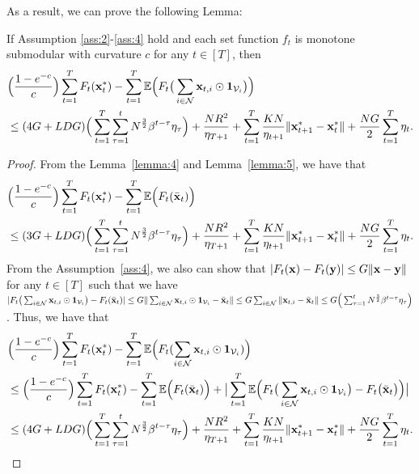 	As a result, we can prove the following Lemma:
	\begin{lemma}\label{thm:3}
	If Assumption \ref{ass:2}-\ref{ass:4} hold and each set function $f_{t}$ is monotone submodular with curvature $c$ for any $t\in[T]$, then
		\begin{equation*}
			\begin{aligned}
				&\Big(\frac{1-e^{-c}}{c}\Big)\sum_{t=1}^{T}F_{t}(\mathbf{x}^{*}_{t})-\sum_{t=1}^{T}\mathbb{E}\Big(F_{t}\big(\sum_{i\in\mathcal{N}}\mathbf{x}_{t,i}\odot\mathbf{1}_{\mathcal{V}_{i}}\big)\Big)\\
				&\le(4G+LDG)\Big(\sum_{t=1}^{T}\sum_{\tau=1}^{t}N^{\frac{3}{2}}\beta^{t-\tau}\eta_{\tau}\Big)+\frac{NR^{2}}{\eta_{T+1}}+\sum_{t=1}^{T}\frac{KN} {\eta_{t+1}}\|\mathbf{x}^{*}_{t+1}-\mathbf{x}^{*}_{t}\|+\frac{NG}{2}\sum_{t=1}^{T}\eta_{t}.		
			\end{aligned}
		\end{equation*}
	\end{lemma}
	\begin{proof}
		From the Lemma~\ref{lemma:4} and  Lemma~\ref{lemma:5}, we have that
		\begin{equation*}
			\begin{aligned}
				&\Big(\frac{1-e^{-c}}{c}\Big)\sum_{t=1}^{T}F_{t}(\mathbf{x}^{*}_{t})-\sum_{t=1}^{T}\mathbb{E}\Big(F_{t}(\bar{\mathbf{x}}_{t})\Big)\\
				&\le (3G+LDG)\Big(\sum_{t=1}^{T}\sum_{\tau=1}^{t}N^{\frac{3}{2}}\beta^{t-\tau}\eta_{\tau}\Big)+\frac{NR^{2}}{\eta_{T+1}}+\sum_{t=1}^{T}\frac{KN} {\eta_{t+1}}\|\mathbf{x}^{*}_{t+1}-\mathbf{x}^{*}_{t}\|+\frac{NG}{2}\sum_{t=1}^{T}\eta_{t}.	
			\end{aligned}
		\end{equation*}
		From the Assumption~\ref{ass:4}, we also can show that $|F_{t}(\mathbf{x})-F_{t}(\mathbf{y})|\le G\|\mathbf{x}-\mathbf{y}\|$ for any $t\in[T]$ such that we have $|F_{t}\big(\sum_{i\in\mathcal{N}}\mathbf{x}_{t,i}\odot\mathbf{1}_{\mathcal{V}_{i}}\big)-F_{t}(\bar{\mathbf{x}}_{t})|\le G\|\sum_{i\in\mathcal{N}}\mathbf{x}_{t,i}\odot\mathbf{1}_{\mathcal{V}_{i}}-\bar{\mathbf{x}}_{t}\|\le G\sum_{i\in\mathcal{N}}\|\mathbf{x}_{t,i}-\bar{\mathbf{x}}_{t}\|\le G\Big(\sum_{\tau=1}^{t}N^{\frac{3}{2}}\beta^{t-\tau}\eta_{\tau}\Big)$. Thus, we have that
\begin{equation*}
			\begin{aligned}
				&\Big(\frac{1-e^{-c}}{c}\Big)\sum_{t=1}^{T}F_{t}(\mathbf{x}^{*}_{t})-\sum_{t=1}^{T}\mathbb{E}\Big(F_{t}(\sum_{i\in\mathcal{N}}\mathbf{x}_{t,i}\odot\mathbf{1}_{\mathcal{V}_{i}})\Big)\\
&\le \Big(\frac{1-e^{-c}}{c}\Big)\sum_{t=1}^{T}F_{t}(\mathbf{x}^{*}_{t})-\sum_{t=1}^{T}\mathbb{E}\Big(F_{t}(\bar{\mathbf{x}}_{t})\Big)+\big|\sum_{t=1}^{T}\mathbb{E}\Big(F_{t}\big(\sum_{i\in\mathcal{N}}\mathbf{x}_{t,i}\odot\mathbf{1}_{\mathcal{V}_{i}}\big)-F_{t}\big(\bar{\mathbf{x}}_{t}\big)\Big)\big|\\
            &\le (4G+LDG)\Big(\sum_{t=1}^{T}\sum_{\tau=1}^{t}N^{\frac{3}{2}}\beta^{t-\tau}\eta_{\tau}\Big)+\frac{NR^{2}}{\eta_{T+1}}+\sum_{t=1}^{T}\frac{KN} {\eta_{t+1}}\|\mathbf{x}^{*}_{t+1}-\mathbf{x}^{*}_{t}\|+\frac{NG}{2}\sum_{t=1}^{T}\eta_{t}.	
			\end{aligned}
		\end{equation*}
\end{proof}
